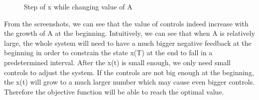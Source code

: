 \documentclass{mcmthesis}
\begin{document}
\begin{figure}[H]
%
%
%


\centering
\caption{Step of x while changing value of A}
\end{figure}


From the screenshots, we can see that the value of controls indeed increase with the growth of A at the beginning. Intuitively, we can see that when A is relatively large, the whole system will need to have a much bigger negative feedback at the beginning in order to constrain the state x(T) at the end to fall in a predetermined interval. After the x(t) is small enough, we only need small controls to adjust the system. If the controls are not big enough at the beginning, the x(t) will grow to a much larger number which may cause even bigger controls. Therefore the objective function will be able to reach the optimal value.
\end{document}
